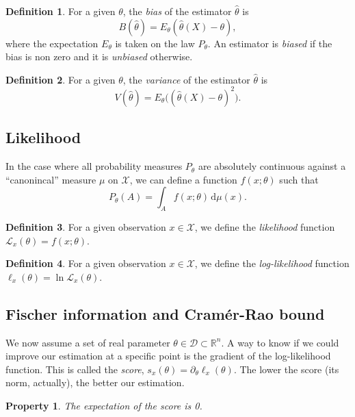 \documentclass[10pt,a4paper]{report}
\theoremstyle{plain}
\newtheorem{prop}[thm]{Property}
\theoremstyle{definition}
\newtheorem{defn}{Definition}[chapter]
\theoremstyle{remark}
\newcommand{\R}{\ensuremath{\mathbb{R}}}
\newcommand{\dd}{\mathrm{d}}
\begin{document}
\begin{defn}
  For a given $\theta$, the \emph{bias} of the estimator $\hat \theta$ is
  \[B(\hat{\theta}) = E_\theta(\hat{\theta}(X) - \theta),\]
  where the expectation $E_\theta$ is taken on the law $P_\theta$. An estimator
  is \emph{biased} if the bias is non zero and it is \emph{unbiased} otherwise.
\end{defn}

\begin{defn}
  For a given $\theta$, the \emph{variance} of the estimator $\hat \theta$ is
  \[V(\hat{\theta}) = E_\theta\Big({(\hat{\theta}(X) - \theta)}^2\Big).\]
\end{defn}

\subsection{Likelihood}

In the case where all probability measures $P_\theta$ are absolutely
continuous against a ``canonincal'' measure $\mu$ on $\mathcal{X}$, we can
define a function $f(x;\theta)$ such that
\[P_\theta(A) = \int_A f(x;\theta)\,\dd \mu(x).\]

\begin{defn}
  For a given observation $x \in \mathcal{X}$, we define the \emph{likelihood} function
  $\mathcal{L}_x(\theta) = f(x;\theta)$.
\end{defn}

\begin{defn}
  For a given observation $x \in \mathcal{X}$, we define the \emph{log-likelihood} function
  $\ell_x(\theta) = \ln \mathcal{L}_x(\theta)$.
\end{defn}

\subsection{Fischer information and Cramér-Rao bound}

We now assume a set of real parameter $\theta \in \mathcal{D} \subset \R^n$.
A way to know if we could improve our estimation at a specific point is the
gradient of the log-likelihood function. This is called the
\emph{score}, $s_x(\theta) = \partial_\theta \ell_x(\theta)$. The
lower the score (its norm, actually), the better our estimation.

\begin{prop} The expectation of the score is 0.
\end{prop}
\end{document}
